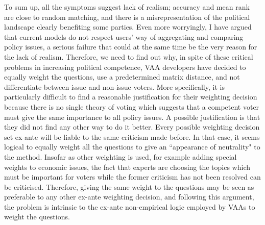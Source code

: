 \documentclass{scrartcl}
\begin{document}
To sum up, all the symptoms suggest lack of realism; accuracy and mean rank are close to random matching, and there is a misrepresentation of the political landscape clearly benefiting some parties. Even more worryingly, I have argued that current models do not respect users' way of aggregating and comparing policy issues, a serious failure that could at the same time be the very reason for the lack of realism. Therefore, we need to find out why, in spite of these critical problems in increasing political competence, VAA developers have decided to equally weight the questions, use a predetermined matrix distance, and not differentiate between issue and non-issue voters. More specifically, it is particularly difficult to find a reasonable justification for their weighting decision because there is no single theory of voting which suggests that a competent voter must give the same importance to all policy issues. A possible justification is that they did not find any other way to do it better. Every possible weighting decision set ex-ante will be liable to the same criticism made before. In that case, it seems logical to equally weight all the questions to give an ``appearance of neutrality" to the method. Insofar as other weighting is used, for example adding special weights to economic issues, the fact that experts are choosing the topics which must be important for voters while the former criticism has not been resolved can be criticised. Therefore, giving the same weight to the questions may be seen as preferable to any other ex-ante weighting decision, and following this argument, the problem is intrinsic to the ex-ante non-empirical logic employed by VAAs to weight the questions. 
\\
\end{document}
